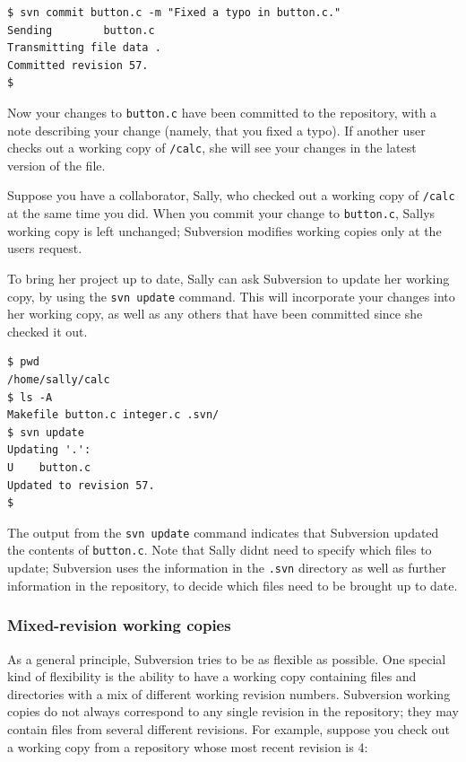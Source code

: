 \begin{verbatim}
$ svn commit button.c -m "Fixed a typo in button.c."
Sending        button.c
Transmitting file data .
Committed revision 57.
$
\end{verbatim}

Now your changes to \texttt{button.c} have been committed to the
repository, with a note describing your change (namely, that you fixed a
typo). If another user checks out a working copy of \texttt{/calc}, she
will see your changes in the latest version of the file.

Suppose you have a collaborator, Sally, who checked out a working copy
of \texttt{/calc} at the same time you did. When you commit your change
to \texttt{button.c}, Sally\textquotesingle s working copy is left
unchanged; Subversion modifies working copies only at the
user\textquotesingle s request.

To bring her project up to date, Sally can ask Subversion to update her
working copy, by using the \texttt{svn\ update} command. This will
incorporate your changes into her working copy, as well as any others
that have been committed since she checked it out.

\begin{verbatim}
$ pwd
/home/sally/calc
$ ls -A
Makefile button.c integer.c .svn/
$ svn update
Updating '.':
U    button.c
Updated to revision 57.
$
\end{verbatim}

The output from the \texttt{svn\ update} command indicates that
Subversion updated the contents of \texttt{button.c}. Note that Sally
didn\textquotesingle t need to specify which files to update; Subversion
uses the information in the \texttt{.svn} directory as well as further
information in the repository, to decide which files need to be brought
up to date.

\subsubsection{Mixed-revision working
copies}\label{svn.basic.in-action.mixedrevs}

As a general principle, Subversion tries to be as flexible as possible.
One special kind of flexibility is the ability to have a working copy
containing files and directories with a mix of different working
revision numbers. Subversion working copies do not always correspond to
any single revision in the repository; they may contain files from
several different revisions. For example, suppose you check out a
working copy from a repository whose most recent revision is 4:

